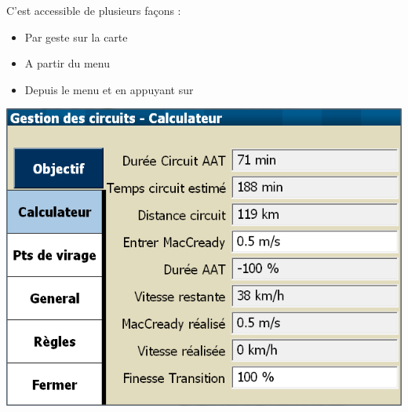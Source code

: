 C'est accessible de plusieurs façons : 
\begin{itemize}
\item Par geste sur la carte
\item A partir du menu
\begin{quote}
\blink{}
\end{quote}
\item Depuis le menu \blink{} et en appuyant sur 
\end{itemize}

\begin{center}
\includegraphics[angle=0,width=0.8\linewidth,keepaspectratio='true']{figures/dialog-taskcalc3.png}
\end{center}

